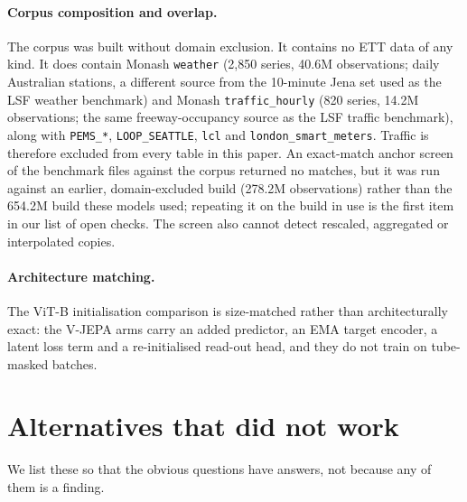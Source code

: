 \paragraph{Corpus composition and overlap.} The corpus was built without domain exclusion. It
contains no ETT data of any kind. It does contain Monash \texttt{weather} (2{,}850 series, 40.6M
observations; daily Australian stations, a different source from the 10-minute Jena set used as the
LSF weather benchmark) and Monash \texttt{traffic\_hourly} (820 series, 14.2M observations; the same
freeway-occupancy source as the LSF traffic benchmark), along with \texttt{PEMS\_*},
\texttt{LOOP\_SEATTLE}, \texttt{lcl} and \texttt{london\_smart\_meters}. Traffic is therefore
excluded from every table in this paper. An exact-match anchor screen of the benchmark files against
the corpus returned no matches, but it was run against an earlier, domain-excluded build (278.2M
observations) rather than the 654.2M build these models used; repeating it on the build in use is
the first item in our list of open checks. The screen also cannot detect rescaled, aggregated or
interpolated copies.

\paragraph{Architecture matching.} The ViT-B initialisation comparison is size-matched rather than
architecturally exact: the V-JEPA arms carry an added predictor, an EMA target encoder, a latent loss
term and a re-initialised read-out head, and they do not train on tube-masked batches.

\section{Alternatives that did not work}
\label{app:failed}

We list these so that the obvious questions have answers, not because any of them is a finding.

